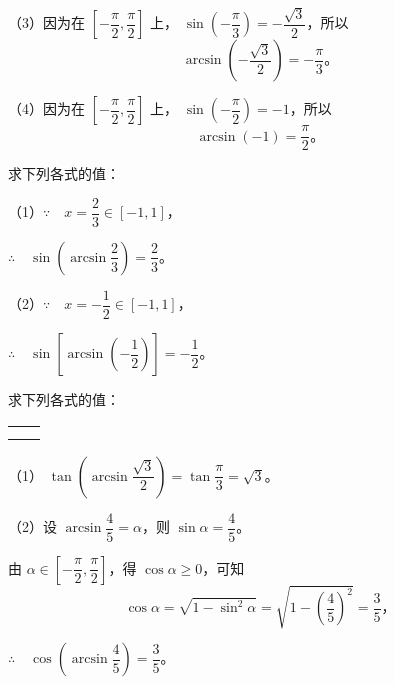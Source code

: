 （3）因为在 $\left[ -\dfrac{\pi}{2}, \dfrac{\pi}{2} \right]$ 上，
$\sin\left( -\dfrac{\pi}{3} \right) = -\dfrac{\sqrt{3}}{2}$，所以
$$ \arcsin \left( -\dfrac{\sqrt{3}}{2} \right) = -\dfrac{\pi}{3} \text{。} $$

（4）因为在 $\left[ -\dfrac{\pi}{2}, \dfrac{\pi}{2} \right]$ 上，
$\sin\left( -\dfrac{\pi}{2} \right) = -1$，所以
$$\arcsin(-1) = \dfrac{\pi}{2} \text{。}$$

\liti 求下列各式的值：
\begin{xiaoxiaotis}


\end{xiaoxiaotis}

\jie （1）$\because \quad x = \dfrac{2}{3} \in [-1, 1]$，

$\therefore \quad \sin\left( \arcsin \dfrac{2}{3} \right) = \dfrac{2}{3}$。

（2）$\because \quad x = -\dfrac{1}{2} \in [-1, 1]$，

$\therefore \quad \sin\left[ \arcsin\left( -\dfrac{1}{2} \right) \right] = -\dfrac{1}{2}$。

\liti 求下列各式的值：
\begin{xiaoxiaotis}

    \renewcommand\arraystretch{1.5}
    \begin{tabular}[t]{*{2}{@{}p{16em}}}
         &  \\
         & 
    \end{tabular}

\end{xiaoxiaotis}

\jie （1） $\tan\left( \arcsin \dfrac{\sqrt{3}}{2} \right) = \tan\dfrac{\pi}{3} = \sqrt{3}$。

（2）设 $\arcsin \dfrac{4}{5} = \alpha$，则 $\sin\alpha = \dfrac{4}{5}$。

由 $\alpha \in \left[ -\dfrac{\pi}{2}, \dfrac{\pi}{2} \right]$，得 $\cos\alpha \geqslant 0$，可知
$$\cos\alpha = \sqrt{1 - \sin^2\alpha} = \sqrt{1 - \left( \dfrac{4}{5} \right)^2} = \dfrac{3}{5} \text{，}$$

$\therefore \quad \cos\left( \arcsin \dfrac{4}{5} \right) = \dfrac{3}{5}$。


